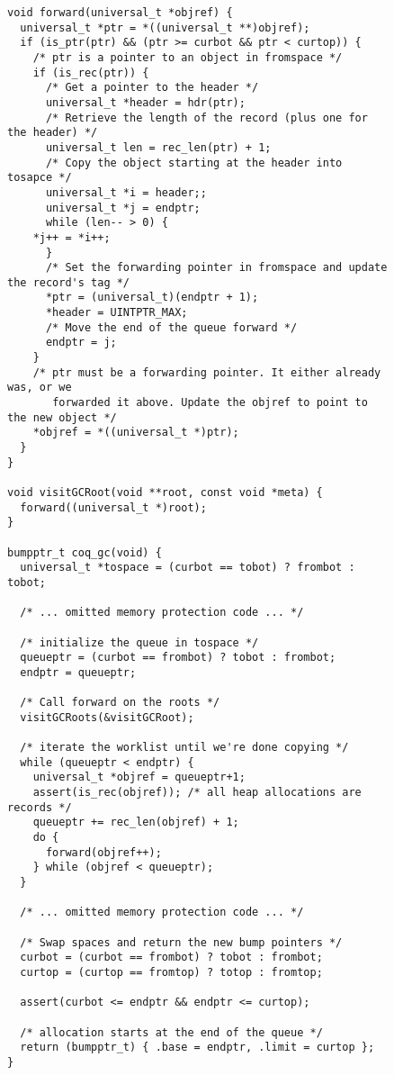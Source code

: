 \documentclass{article}
\begin{document}
\begin{figure}
\begin{lstlisting}
void forward(universal_t *objref) {
  universal_t *ptr = *((universal_t **)objref);
  if (is_ptr(ptr) && (ptr >= curbot && ptr < curtop)) {
    /* ptr is a pointer to an object in fromspace */
    if (is_rec(ptr)) {
      /* Get a pointer to the header */
      universal_t *header = hdr(ptr);
      /* Retrieve the length of the record (plus one for the header) */
      universal_t len = rec_len(ptr) + 1;
      /* Copy the object starting at the header into tosapce */
      universal_t *i = header;;
      universal_t *j = endptr;
      while (len-- > 0) {
	*j++ = *i++;
      }
      /* Set the forwarding pointer in fromspace and update the record's tag */
      *ptr = (universal_t)(endptr + 1);
      *header = UINTPTR_MAX;
      /* Move the end of the queue forward */
      endptr = j;
    }
    /* ptr must be a forwarding pointer. It either already was, or we 
       forwarded it above. Update the objref to point to the new object */
    *objref = *((universal_t *)ptr);
  }
}

void visitGCRoot(void **root, const void *meta) {
  forward((universal_t *)root);
}

bumpptr_t coq_gc(void) {
  universal_t *tospace = (curbot == tobot) ? frombot : tobot;

  /* ... omitted memory protection code ... */

  /* initialize the queue in tospace */
  queueptr = (curbot == frombot) ? tobot : frombot;
  endptr = queueptr;

  /* Call forward on the roots */
  visitGCRoots(&visitGCRoot);

  /* iterate the worklist until we're done copying */
  while (queueptr < endptr) {
    universal_t *objref = queueptr+1;
    assert(is_rec(objref)); /* all heap allocations are records */
    queueptr += rec_len(objref) + 1;
    do {
      forward(objref++);
    } while (objref < queueptr);
  }

  /* ... omitted memory protection code ... */

  /* Swap spaces and return the new bump pointers */
  curbot = (curbot == frombot) ? tobot : frombot;
  curtop = (curtop == fromtop) ? totop : fromtop;

  assert(curbot <= endptr && endptr <= curtop);

  /* allocation starts at the end of the queue */
  return (bumpptr_t) { .base = endptr, .limit = curtop };
}
\end{lstlisting}
\end{figure}
\end{document}
